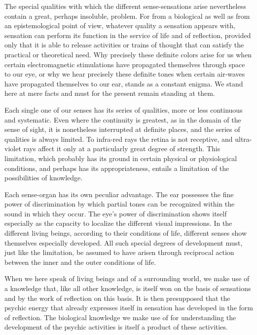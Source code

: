 \documentclass[12pt,a4paper]{book}
\newcommand{\opage}[1]{\marginnote{\footnotesize\textit{[#1]}}}
\begin{document}
The special qualities with which the different sense-sensations arise
nevertheless contain a great, perhaps insoluble, problem. For from a
biological as well as from an epistemological point of view, whatever
quality a sensation appears with, sensation can perform its function in
the service of life and of reflection, provided only that it is able to
release activities or trains of thought that can satisfy the practical or
theoretical need. Why precisely these definite colors arise for us when
certain electromagnetic stimulations have propagated themselves through
space to our eye, or why we hear precisely these definite tones when
certain air-waves have propagated themselves to our ear, stands as a
constant enigma. We stand here at mere facts and must for the present
remain standing at them.

Each single one of our senses has its series of qualities, more or less
continuous and systematic. Even where the continuity is greatest, as in
the domain of the sense of sight, it is nonetheless interrupted at
definite places, and the series of qualities is always \opage{44}limited. To
infra-red rays the retina is not receptive, and ultra-violet rays affect
it only at a particularly great degree of strength. This limitation,
which probably has its ground in certain physical or physiological
conditions, and perhaps has its appropriateness, entails a limitation of
the possibilities of knowledge.

Each sense-organ has its own peculiar advantage. The ear possesses the
fine power of discrimination by which partial tones can be recognized
within the sound in which they occur. The eye's power of discrimination
shows itself especially as the capacity to localize the different visual
impressions. In the different living beings, according to their
conditions of life, different senses show themselves especially
developed. All such special degrees of development must, just like the
limitation, be assumed to have arisen through reciprocal action between
the inner and the outer conditions of life.

When we here speak of living beings and of a surrounding world, we make
use of a knowledge that, like all other knowledge, is itself won on the
basis of sensations and by the work of reflection on this basis. It is
then presupposed that the psychic energy that already expresses itself in
sensation has developed in the form of reflection. The biological
knowledge we make use of for understanding the development of the psychic
activities is itself a product of these activities.
\end{document}
